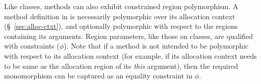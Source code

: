 

Like classes, methods can also exhibit constrained region
polymorphism.  A method definition in \FB is necessarily polymorphic
over its allocation context (\S~\ref{sec:alloc-ctxt}), and
optionally polymorphic with respect to the regions containing its
arguments.  Region parameters, like those on classes, are qualified
with constraints ($\phi$).
Note that if a method is not intended to be polymorphic with respect
to its allocation context (for example, if its allocation context
needs to be same as the allocation region of its \emph{this}
argument), then the required monomorphism can be captured as an
equality constraint in $\phi$.  

